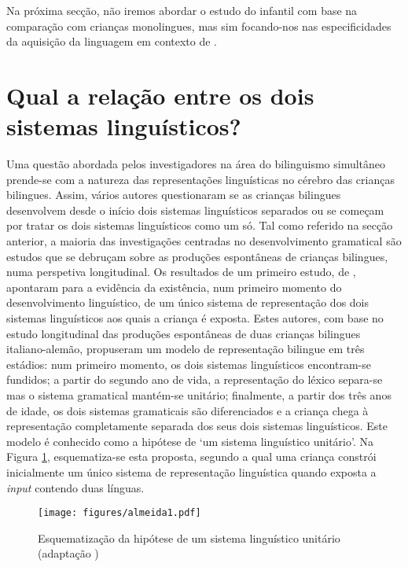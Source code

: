 \documentclass[output=paper]{LSP/langsci}
\begin{document}
Na próxima secção, não iremos abordar o estudo do  infantil com base na comparação com crianças monolingues, mas sim focando-nos nas especificidades da aquisição da linguagem em contexto de . 

\section{Qual a relação entre os dois sistemas linguísticos?}%
\label{sec:almeida_relacao}

Uma questão abordada pelos investigadores na área do bilinguismo simultâneo prende-se com a natureza das representações linguísticas no cérebro das crianças bilingues. Assim, vários autores questionaram se as crianças bilingues desenvolvem desde o início dois sistemas linguísticos separados ou se começam por tratar os dois sistemas linguísticos como um só. Tal como referido na secção anterior, a maioria das investigações centradas no desenvolvimento gramatical são estudos que se debruçam sobre as produções espontâneas de crianças bilingues, numa perspetiva longitudinal. Os resultados de um primeiro estudo, de \citet{volterrataeschner1978}, apontaram para a evidência da existência, num primeiro momento do desenvolvimento linguístico, de um único sistema de representação dos dois sistemas linguísticos aos quais a criança é exposta. Estes autores, com base no estudo longitudinal das produções espontâneas de duas crianças bilingues italiano-alemão, propuseram um modelo de representação bilingue em três estádios: num primeiro momento, os dois sistemas linguísticos encontram-se fundidos; a partir do segundo ano de vida, a representação do léxico separa-se mas o sistema gramatical mantém-se unitário; finalmente, a partir dos três anos de idade, os dois sistemas gramaticais são diferenciados e a criança chega à representação completamente separada dos seus dois sistemas linguísticos. Este modelo é conhecido como a hipótese de `um sistema linguístico unitário'. Na Figura \ref{fig:almeida_1}, esquematiza-se esta proposta, segundo a qual uma criança constrói inicialmente um único sistema de representação linguística quando exposta a \textit{input} contendo duas línguas. 

\begin{figure}[t]
\texttt{[image: figures/almeida1.pdf]}
\caption{Esquematização da hipótese de um sistema linguístico unitário (adaptação \citealt{genesee_etal2004})}
\label{fig:almeida_1}
\end{figure}
\end{document}
